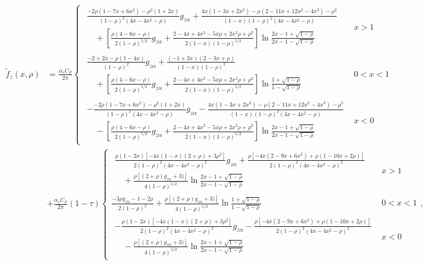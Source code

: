 \begin{align}
\widetilde{f}_z(x,\rho)&=\frac{\alpha_s C_F}{2\pi}\left\{
\begin{array}{lc}
\begin{array}{l}
\frac{-2\rho(1-7x+6x^2)-\rho^2(1+2x)}{(1-\rho)^2(4x-4x^2-\rho)}g_{z\alpha}+\frac{4x(1-3x+2x^2)-\rho(2-11x+12x^2-4x^3)-\rho^2}{(1-x)(1-\rho)^2(4x-4x^2-\rho)}\\
\quad+\left[\frac{\rho(4-6x-\rho)}{2(1-\rho)^{5/2}}g_{z\alpha}+\frac{2-4x+4x^2-5x\rho+2x^2\rho+\rho^2}{2(1-x)(1-\rho)^{5/2}}\right]\ln\frac{2x-1+\sqrt{1-\rho}}{2x-1-\sqrt{1-\rho}}
\end{array} & x>1\\
\begin{array}{l}
\frac{-2+2x-\rho(1-4x)}{(1-\rho)^2}g_{z\alpha}+\frac{(-1+2x)(2-3x+\rho)}{(1-x)(1-\rho)^2}\\
\quad+\left[\frac{\rho(4-6x-\rho)}{2(1-\rho)^{5/2}}g_{z\alpha}+\frac{2-4x+4x^2-5x\rho+2x^2\rho+\rho^2}{2(1-x)(1-\rho)^{5/2}}\right]\ln\frac{1+\sqrt{1-\rho}}{1-\sqrt{1-\rho}}
\end{array} & 0<x<1\\
\begin{array}{l}
-\frac{-2\rho(1-7x+6x^2)-\rho^2(1+2x)}{(1-\rho)^2(4x-4x^2-\rho)}g_{z\alpha}-\frac{4x(1-3x+2x^2)-\rho(2-11x+12x^2-4x^3)-\rho^2}{(1-x)(1-\rho)^2(4x-4x^2-\rho)}\\
\quad-\left[\frac{\rho(4-6x-\rho)}{2(1-\rho)^{5/2}}g_{z\alpha}+\frac{2-4x+4x^2-5x\rho+2x^2\rho+\rho^2}{2(1-x)(1-\rho)^{5/2}}\right]\ln\frac{2x-1+\sqrt{1-\rho}}{2x-1-\sqrt{1-\rho}}
\end{array} & x<0
\end{array}\right.\nonumber\\
&+\frac{\alpha_s C_F}{2\pi}(1-\tau)\left\{
\begin{array}{lc}
\begin{array}{l}
\frac{\rho(1-2x)[-4x(1-x)(2+\rho)+3\rho^2]}{2(1-\rho)^2(4x-4x^2-\rho)^2}g_{z\alpha}+\frac{\rho[-4x(2-9x+6x^2)+\rho(1-10x+2\rho)]}{2(1-\rho)^2(4x-4x^2-\rho)^2}\\
\quad+\frac{\rho[(2+\rho)g_{z\alpha}+3)]}{4(1-\rho)^{5/2}}\ln\frac{2x-1+\sqrt{1-\rho}}{2x-1-\sqrt{1-\rho}}
\end{array} & x>1\\
\frac{-3\rho g_{z\alpha}-1-2\rho}{2(1-\rho)^2}+\frac{\rho[(2+\rho)g_{z\alpha}+3)]}{4(1-\rho)^{5/2}}\ln\frac{1+\sqrt{1-\rho}}{1-\sqrt{1-\rho}} & 0<x<1\\
\begin{array}{l}
-\frac{\rho(1-2x)[-4x(1-x)(2+\rho)+3\rho^2]}{2(1-\rho)^2(4x-4x^2-\rho)^2}g_{z\alpha}-\frac{\rho[-4x(2-9x+6x^2)+\rho(1-10x+2\rho)]}{2(1-\rho)^2(4x-4x^2-\rho)^2}\\
\quad-\frac{\rho[(2+\rho)g_{z\alpha}+3)]}{4(1-\rho)^{5/2}}\ln\frac{2x-1+\sqrt{1-\rho}}{2x-1-\sqrt{1-\rho}}
\end{array} & x<0
\end{array}\right.,
\end{align}
